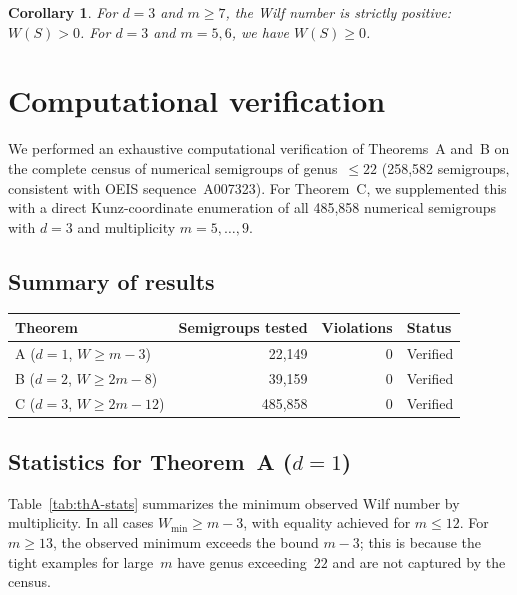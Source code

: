 \documentclass[11pt]{amsart}
\newtheorem{corollary}[theorem]{Corollary}
\theoremstyle{definition}
\theoremstyle{remark}
\begin{document}
\begin{corollary}\label{cor:positive-d3}
For $d = 3$ and $m \ge 7$, the Wilf number is strictly positive: $W(S) > 0$.
For $d = 3$ and $m = 5, 6$, we have $W(S) \ge 0$.
\end{corollary}

\section{Computational verification}\label{sec:computation}

We performed an exhaustive computational verification of Theorems~A and~B
on the complete census of numerical semigroups of genus~$\le 22$
(258{,}582 semigroups, consistent with OEIS sequence~A007323).
For Theorem~C, we supplemented this with a direct Kunz-coordinate
enumeration of all 485{,}858 numerical semigroups with $d = 3$ and
multiplicity $m = 5, \ldots, 9$.

\subsection{Summary of results}

\begin{center}
\begin{tabular}{lrrl}
\toprule
\textbf{Theorem} & \textbf{Semigroups tested} & \textbf{Violations} & \textbf{Status} \\
\midrule
A ($d = 1$, $W \ge m - 3$)  & 22{,}149 & 0 & Verified \\
B ($d = 2$, $W \ge 2m - 8$) & 39{,}159 & 0 & Verified \\
C ($d = 3$, $W \ge 2m - 12$)  & 485{,}858 & 0 & Verified \\
\bottomrule
\end{tabular}
\end{center}

\subsection{Statistics for Theorem~A ($d=1$)}

Table~\ref{tab:thA-stats} summarizes the minimum observed Wilf number
by multiplicity.  In all cases $W_{\min} \ge m - 3$, with equality achieved
for $m \le 12$.  For $m \ge 13$, the observed minimum exceeds the bound
$m - 3$; this is because the tight examples for large~$m$ have genus
exceeding~$22$ and are not captured by the census.
\end{document}
